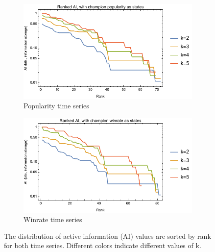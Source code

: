 \documentclass[twoside]{article}
\begin{document}
\begin{multicols}{2}
\begin{figure}
\centering
\begin{subfigure}{.5\textwidth}
  \centering
  \includegraphics[width=1\linewidth]{population_AI_prelim.pdf}
  \caption{Popularity time series}
  \label{fig:sub1}
\end{subfigure}%
\begin{subfigure}{.5\textwidth}
  \centering
  \includegraphics[width=1\linewidth]{winrate_AI_prelim.pdf}
  \caption{Winrate time series}
  \label{fig:sub2}
\end{subfigure}
\caption{The distribution of active information (AI) values are sorted by rank for both time series. Different colors indicate different values of k.}
\label{fig:test}
\end{figure}


\end{multicols}
\end{document}
